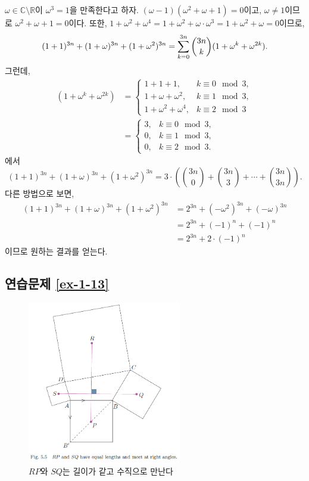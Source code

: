 $\omega\in\mathbb C\setminus \mathbb R$이 $\omega^3=1$을 만족한다고 하자.
$(\omega-1)(\omega^2+\omega+1)=0$이고,
$\omega\ne1$이므로 $\omega^2+\omega+1=0$이다.
또한, $1+\omega^2+\omega^4 = 1+ \omega^2 + \omega\cdot\omega^3 =
1+ \omega^2 + \omega = 0$이므로,
\[
(1+1)^{3n} + (1+\omega)^{3n} + (1+\omega^2)^{3n}
= \sum\limits_{k=0}^{3n} {3n \choose k} (1+\omega^k + \omega^{2k}).
\]
그런데,
\begin{align*}
(1+\omega^k + \omega^{2k})
&= \begin{cases}
1+1+1, & k\equiv 0 \mod 3, \\
1+\omega + \omega^2, & k\equiv 1 \mod 3, \\
1+\omega^2 + \omega^4,& k\equiv 2 \mod 3
\end{cases} \\
&=\begin{cases}
3, & k\equiv 0 \mod 3, \\
0, & k\equiv 1 \mod 3, \\
0, & k\equiv 2 \mod 3.
\end{cases}
\end{align*}
에서
\[
(1+1)^{3n} + (1+\omega)^{3n} + (1+\omega^2)^{3n}
= 3\cdot \left(
{3n \choose 0} + {3n \choose 3} + \cdots + {3n \choose 3n} \right).
\]
다른 방법으로 보면,
\begin{align*}
(1+1)^{3n} + (1+\omega)^{3n} + (1+\omega^2)^{3n}
&= 2^{3n} + (-\omega^2)^{3n} +  (-\omega)^{3n} \\
&= 2^{3n} + (-1)^n + (-1)^n \\
&= 2^{3n} + 2\cdot(-1)^n
\end{align*}
이므로 원하는 결과를 얻는다.

\subsection*{연습문제 \ref{ex-1-13}}

\begin{figure}[h!]
\begin{center}
\includegraphics[width=0.6\textwidth]{./Solution/figs/fig-5-5}
\end{center}
\caption{$RP$와 $SQ$는 길이가 같고 수직으로 만난다}
\label{fig-5-5}
\end{figure}


